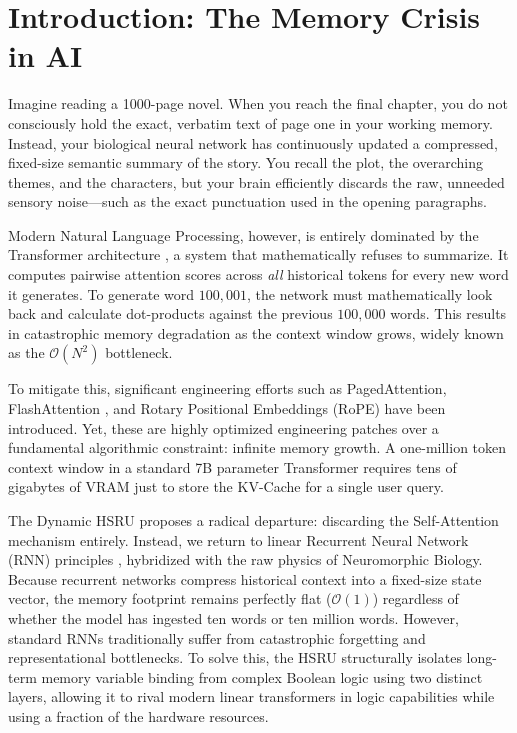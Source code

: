 \documentclass[11pt,a4paper]{article}
\begin{document}
\tableofcontents
\newpage

\section{Introduction: The Memory Crisis in AI}
Imagine reading a 1000-page novel. When you reach the final chapter, you do not consciously hold the exact, verbatim text of page one in your working memory. Instead, your biological neural network has continuously updated a compressed, fixed-size semantic summary of the story. You recall the plot, the overarching themes, and the characters, but your brain efficiently discards the raw, unneeded sensory noise---such as the exact punctuation used in the opening paragraphs. 

Modern Natural Language Processing, however, is entirely dominated by the Transformer architecture \cite{vaswani2017attention}, a system that mathematically refuses to summarize. It computes pairwise attention scores across \textit{all} historical tokens for every new word it generates. To generate word $100,001$, the network must mathematically look back and calculate dot-products against the previous $100,000$ words. This results in catastrophic memory degradation as the context window grows, widely known as the $\mathcal{O}(N^2)$ bottleneck.

To mitigate this, significant engineering efforts such as PagedAttention, FlashAttention \cite{dao2022flashattention}, and Rotary Positional Embeddings (RoPE) have been introduced. Yet, these are highly optimized engineering patches over a fundamental algorithmic constraint: infinite memory growth. A one-million token context window in a standard 7B parameter Transformer requires tens of gigabytes of VRAM just to store the KV-Cache for a single user query.

The Dynamic HSRU proposes a radical departure: discarding the Self-Attention mechanism entirely. Instead, we return to linear Recurrent Neural Network (RNN) principles \cite{hochreiter1997long, peng2023rwkv}, hybridized with the raw physics of Neuromorphic Biology. Because recurrent networks compress historical context into a fixed-size state vector, the memory footprint remains perfectly flat ($\mathcal{O}(1)$) regardless of whether the model has ingested ten words or ten million words. However, standard RNNs traditionally suffer from catastrophic forgetting and representational bottlenecks. To solve this, the HSRU structurally isolates long-term memory variable binding from complex Boolean logic using two distinct layers, allowing it to rival modern linear transformers \cite{gu2023mamba, sun2023retentive} in logic capabilities while using a fraction of the hardware resources.
\end{document}
